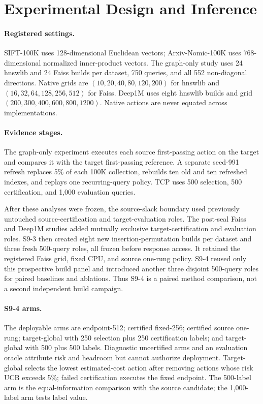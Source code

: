\section{Experimental Design and Inference}
\label{sec:methodology}

\paragraph{Registered settings.}
SIFT-100K uses 128-dimensional Euclidean vectors; Arxiv-Nomic-100K uses 768-dimensional normalized inner-product vectors. The graph-only study uses 24 hnswlib and 24 Faiss builds per dataset, 750 queries, and all 552 non-diagonal directions. Native grids are $(10,20,40,80,120,200)$ for hnswlib and $(16,32,64,128,256,512)$ for Faiss. Deep1M uses eight hnswlib builds and grid $(200,300,400,600,800,1200)$. Native actions are never equated across implementations.

\paragraph{Evidence stages.}
The graph-only experiment executes each source first-passing action on the target and compares it with the target first-passing reference. A separate seed-991 refresh replaces 5\% of each 100K collection, rebuilds ten old and ten refreshed indexes, and replays one recurring-query policy. TCP uses 500 selection, 500 certification, and 1,000 evaluation queries.

After these analyses were frozen, the source-slack boundary used previously untouched source-certification and target-evaluation roles. The post-seal Faiss and Deep1M studies added mutually exclusive target-certification and evaluation roles. S9-3 then created eight new insertion-permutation builds per dataset and three fresh 500-query roles, all frozen before response access. It retained the registered Faiss grid, fixed CPU, and source one-rung policy. S9-4 reused only this prospective build panel and introduced another three disjoint 500-query roles for paired baselines and ablations. Thus S9-4 is a paired method comparison, not a second independent build campaign.

\paragraph{S9-4 arms.}
The deployable arms are endpoint-512; certified fixed-256; certified source one-rung; target-global with 250 selection plus 250 certification labels; and target-global with 500 plus 500 labels. Diagnostic uncertified arms and an evaluation oracle attribute risk and headroom but cannot authorize deployment. Target-global selects the lowest estimated-cost action after removing actions whose risk UCB exceeds 5\%; failed certification executes the fixed endpoint. The 500-label arm is the equal-information comparison with the source candidate; the 1,000-label arm tests label value.

